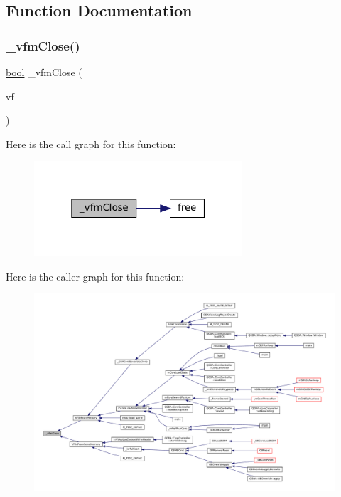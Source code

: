 \subsection{Function Documentation}
\mbox{\label{vfs-mem_8c_ab569910e874a68f8a9a7c8440c5d0781}} 
\subsubsection{\texorpdfstring{\+\_\+vfm\+Close()}{\_vfmClose()}}
{\footnotesize\ttfamily \mbox{\hyperlink{libretro_8h_a4a26dcae73fb7e1528214a068aca317e}{bool}} \+\_\+vfm\+Close (\begin{DoxyParamCaption}\item[{struct V\+File $\ast$}]{vf }\end{DoxyParamCaption})\hspace{0.3cm}{\ttfamily [static]}}

Here is the call graph for this function\+:
\nopagebreak
\begin{figure}[H]
\begin{center}
\leavevmode
\includegraphics[width=220pt]{vfs-mem_8c_ab569910e874a68f8a9a7c8440c5d0781_cgraph}
\end{center}
\end{figure}
Here is the caller graph for this function\+:
\nopagebreak
\begin{figure}[H]
\begin{center}
\leavevmode
\includegraphics[width=350pt]{vfs-mem_8c_ab569910e874a68f8a9a7c8440c5d0781_icgraph}
\end{center}
\end{figure}
\mbox{\label{vfs-mem_8c_a069232afe676b38b6fc35d195b890a78}} 
